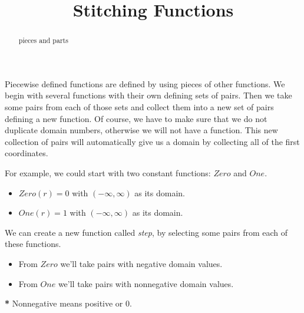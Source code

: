 \documentclass{ximera}
\title{Stitching Functions}
\begin{document}
\begin{abstract}
pieces and parts
\end{abstract}
\maketitle



Piecewise defined functions are defined by using pieces of other functions. We begin with several functions with their own defining sets of pairs.  Then we take some pairs from each of those sets and collect them into a new set of pairs defining a new function.  Of course, we have to make sure that we do not duplicate domain numbers, otherwise we will not have a function.  This new collection of pairs will automatically give us a domain by collecting all of the first coordinates.

For example, we could start with two constant functions: $Zero$ and $One$.

\begin{itemize}
\item $Zero(r) = 0$ with $(-\infty, \infty)$ as its domain.
\item $One(r) = 1$ with $(-\infty, \infty)$ as its domain.
\end{itemize}

We can create a new function called \textit{step}, by selecting some pairs from each of these functions.  
\begin{itemize}
\item From $Zero$ we'll take pairs with negative domain values.
\item From $One$ we'll take pairs with nonnegative domain values.
\end{itemize}

\textbf{*} Nonnegative means positive or 0.
\end{document}
